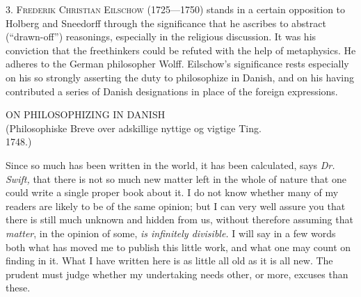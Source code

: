 \documentclass[12pt,a4paper,openany]{book}
\newcommand{\opage}[1]{\marginnote{\footnotesize\textit{[#1]}}}
\newcommand{\excerpthead}[1]{\par\bigskip\begin{center}#1\end{center}\nopagebreak\smallskip}
\newenvironment{intro}{\par}{\par}
\begin{document}
\begin{intro}

3. \textsc{Frederik Christian Eilschow} (1725---1750) stands in a certain
opposition to Holberg and Sneedorff through the significance that he ascribes to
abstract (``drawn-off'') reasonings, especially in the religious discussion. It was
his conviction that the freethinkers could be refuted with the help of metaphysics.
He adheres to the German philosopher Wolff. Eilschow's significance rests
especially on his so strongly asserting the duty to philosophize in Danish, and on
his having contributed a series of Danish designations in place of the foreign
expressions.

\end{intro}

\setcounter{footnote}{0}%
\excerpthead{ON PHILOSOPHIZING IN DANISH \\ (Philosophiske Breve over adskillige nyttige og vigtige Ting. \\ 1748.)}\opage{36}

Since so much has been written in the world, it has been calculated, says
\textit{Dr. Swift,} that there is not so much new matter left in the whole of
nature that one could write a single proper book about it. I do not know whether
many of my readers are likely to be of the same opinion; but I can very well
assure you that there is still much unknown and hidden from us, without therefore
assuming that \emph{matter}, in the opinion of some, \emph{is infinitely divisible.} I will say in a
few words both what has moved me to publish this little work, and what one may
count on finding in it. What I have written here is as little all old as it is
all new. The prudent must judge whether my undertaking needs other, or more,
excuses than these.
\end{document}
